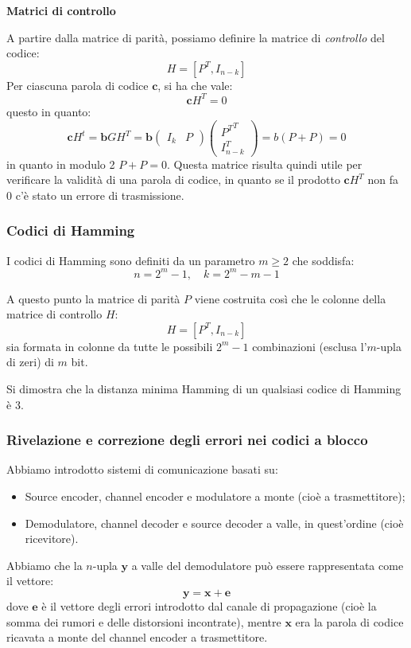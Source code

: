 \documentclass[a4paper,11pt]{article}
\begin{document}
\par\smallskip

\noindent
\textbf{\textsf{Matrici di controllo}}

\noindent
A partire dalla matrice di parità, possiamo definire la matrice di \textit{controllo} del codice:
$$
H = [P^T, I_{n - k}]
$$
Per ciascuna parola di codice $\mathbf{c}$, si ha che vale:
$$
\mathbf{c} H^T = 0
$$
questo in quanto:
$$
\mathbf{c} H^t = \mathbf{b} G H^T = \mathbf{b}
\begin{pmatrix}
	I_k & P
\end{pmatrix}
\begin{pmatrix}
	{P^T}^T \\ I_{n-k}^T
\end{pmatrix}
= b \left( P + P\right) = 0
$$
in quanto in modulo 2 $P + P = 0$.
Questa matrice risulta quindi utile per verificare la validità di una parola di codice, in quanto se il prodotto $\mathbf{c} H^T$ non fa 0 c'è stato un errore di trasmissione. 

\subsubsection{Codici di Hamming}
I codici di Hamming sono definiti da un parametro $m \geq 2$ che soddisfa:
$$
n = 2^m - 1, \quad k = 2^m - m - 1
$$

A questo punto la matrice di parità $P$ viene costruita così che le colonne della matrice di controllo $H$:
$$
H = [P^T, I_{n - k}]
$$
sia formata in colonne da tutte le possibili $2^m - 1$ combinazioni (esclusa l'$m$-upla di zeri) di $m$ bit.

Si dimostra che la distanza minima Hamming di un qualsiasi codice di Hamming è 3.

\subsubsection{Rivelazione e correzione degli errori nei codici a blocco}
Abbiamo introdotto sistemi di comunicazione basati su:
\begin{itemize}
	\item Source encoder, channel encoder e modulatore a monte (cioè a trasmettitore);
	\item Demodulatore, channel decoder e source decoder a valle, in quest'ordine (cioè ricevitore).
\end{itemize}

Abbiamo che la $n$-upla $\mathbf{y}$ a valle del demodulatore può essere rappresentata come il vettore:
$$
\mathbf{y} = \mathbf{x} + \mathbf{e}
$$
dove $\mathbf{e}$ è il vettore degli errori introdotto dal canale di propagazione (cioè la somma dei rumori e delle distorsioni incontrate), mentre $\mathbf{x}$ era la parola di codice ricavata a monte del channel encoder a trasmettitore.
\end{document}
